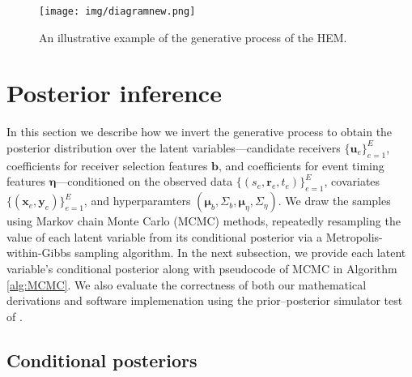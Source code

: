 \documentclass[ba]{imsart}
\numberwithin{equation}{section}
\theoremstyle{plain}
\begin{document}
		\begin{figure}[!t]
			\centering
			\texttt{[image: img/diagramnew.png]}	
			\caption {An illustrative example of the generative process of the HEM.}
			\label{figure:diagram}
		\end{figure}	
		
	\section{Posterior inference}\label{sec:inference}
	In this section we describe how we invert the generative process to obtain the posterior distribution over the latent variables---candidate receivers $\{\boldsymbol{u}_e\}_{e=1}^E$, coefficients for receiver selection features $\boldsymbol{b}$, and coefficients for event timing features $\boldsymbol{\eta}$---conditioned on the observed data $\{(s_e, \boldsymbol{r}_e, t_e)\}_{e=1}^E$, covariates $\{(\boldsymbol{x}_e, \boldsymbol{y}_e)\}_{e=1}^E$, and hyperparamters $(\boldsymbol{\mu}_b, \Sigma_b, \boldsymbol{\mu}_\eta, \Sigma_\eta)$. We draw the samples using Markov chain Monte Carlo (MCMC) methods, repeatedly resampling the value of each latent variable from its conditional posterior via a Metropolis-within-Gibbs sampling algorithm. In the next subsection, we provide each latent variable's conditional posterior along with pseudocode of MCMC in Algorithm \ref{alg:MCMC}. We also evaluate the correctness of both our mathematical derivations and software implemenation using the prior--posterior simulator test of \cite{geweke2004getting}.
	
	\subsection{Conditional posteriors}\label{subsec:conditionaldist}
\end{document}

